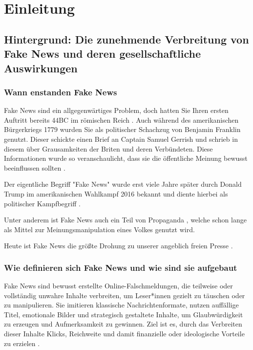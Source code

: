 \chapter{Einleitung}
\label{chap:einleitung}

\section{Hintergrund: Die zunehmende Verbreitung von Fake News und deren gesellschaftliche Auswirkungen}
\label{sec:hintergrund}

\subsection{Wann enstanden Fake News}

Fake News sind ein allgegenwärtiges Problem, doch hatten Sie Ihren ersten Auftritt bereits 44BC im römischen Reich \cite{socsci9100185}.
Auch während des amerikanischen Bürgerkriegs 1779 wurden Sie als politischer Schachzug von Benjamin Franklin genutzt.
Dieser schickte einen Brief an Captain Samuel Gerrish und schrieb in diesem über Grausamkeiten der Briten und deren Verbündeten. 
Diese Informationen wurde so veranschaulicht, dass sie die öffentliche Meinung bewusst beeinflussen sollten \cite{Sharma:2024}.

Der eigentliche Begriff "Fake News" wurde erst viele Jahre später durch Donald Trump im amerikanischen Wahlkampf 2016 bekannt \cite{Ashish2024} 
und diente hierbei als politischer Kampfbegriff \cite{buerker2022fakenews}.

Unter anderem ist Fake News auch ein Teil von Propaganda \cite{buerker2022fakenews}, welche schon lange als Mittel zur Meinungsmanipulation eines Volkes genutzt wird.

Heute ist Fake News die größte Drohung zu unserer angeblich freien Presse \cite{Sharma:2024}.

\subsection{Wie definieren sich Fake News und wie sind sie aufgebaut}

Fake News sind bewusst erstellte Online-Falschmeldungen, die teilweise oder vollständig unwahre Inhalte verbreiten, 
um Leser*innen gezielt zu täuschen oder zu manipulieren. Sie imitieren klassische Nachrichtenformate, nutzen auﬀällige Titel, emotionale Bilder und strategisch gestaltete
Inhalte, um Glaubwürdigkeit zu erzeugen und Aufmerksamkeit zu gewinnen. Ziel ist es, durch das Verbreiten dieser Inhalte Klicks, Reichweite und damit finanzielle oder ideologische Vorteile zu
erzielen \cite{socsci9100185}.

